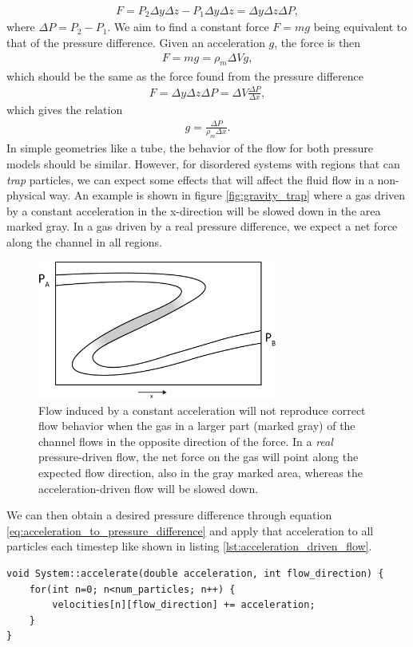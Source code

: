 \begin{align}
	F = P_2\Delta y\Delta z - P_1\Delta y\Delta z = \Delta y\Delta z\Delta P,
\end{align}
where $\Delta P = P_2 - P_1$. We aim to find a constant force $F=mg$ being equivalent to that of the pressure difference. Given an acceleration $g$, the force is then
\begin{align}
	F = mg = \rho_m \Delta V g,
\end{align}
which should be the same as the force found from the pressure difference
\begin{align}
	F = \Delta y\Delta z\Delta P = \Delta V \frac{\Delta P}{\Delta x},	
\end{align}
which gives the relation
\begin{align}
	\label{eq:acceleration_to_pressure_difference}
	g = \frac{\Delta P}{\rho_m\Delta x}.
\end{align}
In simple geometries like a tube, the behavior of the flow for both pressure models should be similar. However, for disordered systems with regions that can \textit{trap} particles, we can expect some effects that will affect the fluid flow in a non-physical way. An example is shown in figure \ref{fig:gravity_trap} where a gas driven by a constant acceleration in the x-direction will be slowed down in the area marked gray. In a gas driven by a real pressure difference, we expect a net force along the channel in all regions.
\begin{figure}[h]
\begin{center}
\includegraphics[width=0.7\textwidth, trim=0cm 0cm 0cm 0cm, clip]{DSMC/figures/gravity_problem.eps}
\end{center}
\caption{Flow induced by a constant acceleration will not reproduce correct flow behavior when the gas in a larger part (marked gray) of the channel flows in the opposite direction of the force. In a \textit{real} pressure-driven flow, the net force on the gas will point along the expected flow direction, also in the gray marked area, whereas the acceleration-driven flow will be slowed down.}
\label{fig:gravity_problem}
\end{figure}
We can then obtain a desired pressure difference through equation \eqref{eq:acceleration_to_pressure_difference} and apply that acceleration to all particles each timestep like shown in listing \ref{lst:acceleration_driven_flow}.
\begin{lstlisting}[caption=Acceleration of particles in the DSMC code., label=lst:acceleration_driven_flow]
void System::accelerate(double acceleration, int flow_direction) {
    for(int n=0; n<num_particles; n++) {
    	velocities[n][flow_direction] += acceleration;
    }
}
\end{lstlisting}
